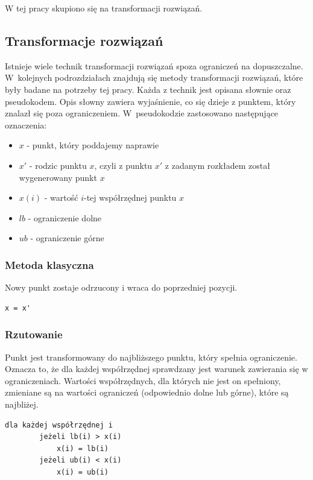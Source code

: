 \documentclass{mini}
\begin{document}
W tej pracy skupiono się na transformacji rozwiązań.

\subsection{Transformacje rozwiązań} \label{transformacje}
Istnieje wiele technik transformacji rozwiązań spoza ograniczeń na dopuszczalne. W~kolejnych podrozdziałach znajdują się metody transformacji rozwiązań, które były badane na potrzeby tej pracy. Każda z technik jest opisana słownie oraz pseudokodem. Opis słowny zawiera wyjaśnienie, co się dzieje z punktem, który znalazł się poza ograniczeniem. W~pseudokodzie zastosowano następujące oznaczenia:
\begin{itemize}[noitemsep]
\item $x$ - punkt, który poddajemy naprawie
\item $x'$ - rodzic punktu $x$, czyli z punktu $x'$ z zadanym rozkładem został wygenerowany punkt $x$
\item $x(i)$ - wartość $i$-tej współrzędnej punktu $x$
\item $lb$ - ograniczenie dolne
\item $ub$ - ograniczenie górne
\end{itemize}

\subsubsection{Metoda klasyczna}
Nowy punkt zostaje odrzucony i wraca do poprzedniej pozycji.

\begin{Verbatim}[baselinestretch=1.1]
	x = x'
\end{Verbatim}


\subsubsection{Rzutowanie}
\label{secrzut}
Punkt jest transformowany do najbliższego punktu, który spełnia ograniczenie. Oznacza to, że dla każdej współrzędnej sprawdzany jest warunek zawierania się w ograniczeniach. Wartości współrzędnych, dla których nie jest on spełniony, zmieniane są na wartości ograniczeń (odpowiednio dolne lub górne), które są najbliżej.

\begin{Verbatim}[baselinestretch=1.1]
	dla każdej współrzędnej i
		jeżeli lb(i) > x(i)
			x(i) = lb(i)
		jeżeli ub(i) < x(i)
			x(i) = ub(i)
\end{Verbatim}
\end{document}
